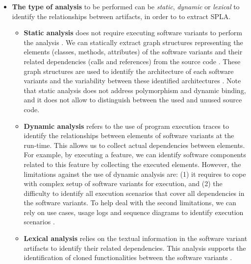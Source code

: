 \documentclass[graybox]{svmult}
\begin{document}
\begin{itemize}
	\item \textbf{The type of analysis} to be performed  can be \textit{static}, \textit{dynamic} or \textit{lexical} to identify the relationships between artifacts, in order to to extract SPLA.

    \begin{itemize}
	    \item \textbf{Static analysis} does not require executing software variants to perform the analysis  \cite{pinzger2004architecture,shatnawi2017recovering,Weinreich2012}. We can statically extract graph structures representing the elements (classes, methods, attributes) of the software variants and their related dependencies (calls and references) from the source code \cite{shatnawi2017analyzing}. These graph structures are used to identify the architecture of each software variants and the variability between these identified architectures \cite{pinzger2004architecture,shatnawi2017recovering}. Note that static analysis does not address polymorphism and dynamic binding, and it does not allow to distinguish between the used and unused source code. 
	
	    \item \textbf{Dynamic analysis}  {refers to the use of program execution traces to identify the relationships between elements of software variants at the run-time. This allows us to collect actual dependencies between elements. For example, by executing a feature, we can identify software components related to this feature by collecting the executed elements.} However, the limitations against the use of dynamic analysis are: (1) it requires to cope with complex setup of software variants for execution, and (2) the difficulty to identify  all execution scenarios that cover all dependencies in the software variants. To help deal with the second limitations, we can rely on use cases, usage logs and sequence diagrams to identify execution scenarios \cite{Dugerdil:2013:DDT:2480362.2480602,mishra2009creating, shatnawi2018identifying}. 

    	\item \textbf{Lexical analysis} relies on the textual information in the software variant artifacts to identify their related dependencies. This analysis supports the identification of cloned functionalities between the software variants \cite{frenzel2007extending,kolb2005case,kolb2006refactoring,koschke2009extending,mende2008supporting,mende2009evaluation}. 
    \end{itemize}


\end{itemize}
\end{document}
